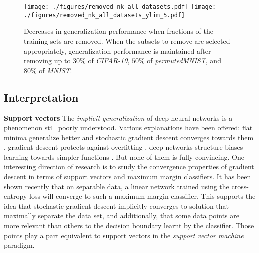 \begin{figure}[h]
    \begin{center}
    \texttt{[image: ./figures/removed\_nk\_all\_datasets.pdf]}
    \texttt{[image: ./figures/removed\_nk\_all\_datasets\_ylim\_5.pdf]}
    \end{center}
    \caption{Decreases in generalization performance when fractions of the training sets are removed. When the subsets to remove are selected appropriately, generalization performance is maintained after removing up to $30\%$ of \emph{CIFAR-10}, $50\%$ of \emph{permutedMNIST}, and $80\%$ of \emph{MNIST}.}
    \label{fig:removed_subsets}
\end{figure}




\subsection{Interpretation}

\textbf{Support vectors} The \textit{implicit generalization} of deep neural networks \citep{zhang2016understanding} is a phenomenon still poorly understood. Various explanations have been offered: flat minima generalize better and stochastic gradient descent converges towards them \citep{flatminima,kleinbergSGD}, gradient descent protects against overfitting \citep{Advani2017HighdimensionalDO,dynamics}, deep networks structure biases learning towards simpler functions \citep{implicit_bias,function_map}. But none of them is fully convincing. One interesting direction of research is to study the convergence properties of gradient descent in terms of support vectors and maximum margin classifiers. It has been shown recently \citep{Soudry2017} that on separable data, a linear network trained using the cross-entropy loss will converge to such a maximum margin classifier. This supports the idea that stochastic gradient descent implicitly converges to solution that maximally separate the data set, and additionally, that some data points are more relevant than others to the decision boundary learnt by the classifier. Those points play a part equivalent to support vectors in the \textit{support vector machine} paradigm.

